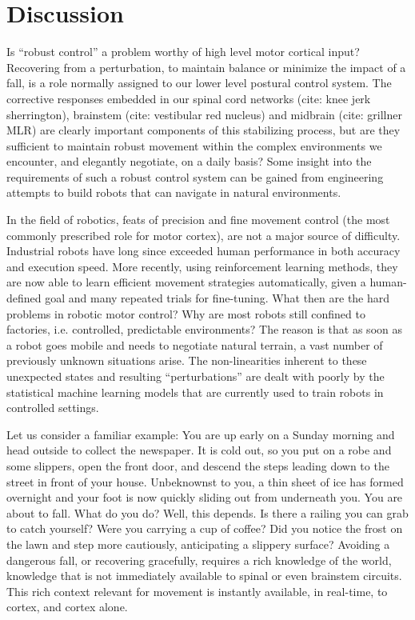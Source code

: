 \section{Discussion}

Is ``robust control'' a problem worthy of high level motor cortical input? Recovering from a perturbation, to maintain balance or minimize the impact of a fall, is a role normally assigned to our lower level postural control system. The corrective responses embedded in our spinal cord networks (cite: knee jerk sherrington), brainstem (cite: vestibular red nucleus) and midbrain (cite: grillner MLR) are clearly important components of this stabilizing process, but are they sufficient to maintain robust movement within the complex environments we encounter, and elegantly negotiate, on a daily basis? Some insight into the requirements of such a robust control system can be gained from engineering attempts to build robots that can navigate in natural environments.

In the field of robotics, feats of precision and fine movement control (the most commonly prescribed role for motor cortex), are not a major source of difficulty. Industrial robots have long since exceeded human performance in both accuracy and execution speed. More recently, using reinforcement learning methods, they are now able to learn efficient movement strategies automatically, given a human-defined goal and many repeated trials for fine-tuning. What then are the hard problems in robotic motor control? Why are most robots still confined to factories, i.e. controlled, predictable environments? The reason is that as soon as a robot goes mobile and needs to negotiate natural terrain, a vast number of previously unknown situations arise. The non-linearities inherent to these unexpected states and resulting ``perturbations'' are dealt with poorly by the statistical machine learning models that are currently used to train robots in controlled settings.

Let us consider a familiar example: You are up early on a Sunday morning and head outside to collect the newspaper. It is cold out, so you put on a robe and some slippers, open the front door, and descend the steps leading down to the street in front of your house. Unbeknownst to you, a thin sheet of ice has formed overnight and your foot is now quickly sliding out from underneath you. You are about to fall. What do you do? Well, this depends. Is there a railing you can grab to catch yourself? Were you carrying a cup of coffee? Did you notice the frost on the lawn and step more cautiously, anticipating a slippery surface? Avoiding a dangerous fall, or recovering gracefully, requires a rich knowledge of the world, knowledge that is not immediately available to spinal or even brainstem circuits. This rich context relevant for movement is instantly available, in real-time, to cortex, and cortex alone.

